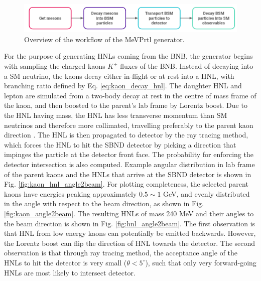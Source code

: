 \begin{figure}[htbp!] 
\centering    
\includegraphics[width=1.0\textwidth]{MeVPrtl_Workflow}
\caption[MeVPrtl_Workflow]{
Overview of the workflow of the MeVPrtl generator.
}
\label{fig:MeVPrtl_Workflow}
\end{figure}

For the purpose of generating HNLs coming from the BNB, the generator begins with sampling the charged kaons $K^{+}$ fluxes of the BNB.
Instead of decaying into a SM neutrino, the kaons decay either in-flight or at rest into a HNL, with branching ratio defined by Eq. \ref{eq:kaon_decay_hnl}.
The daughter HNL and lepton are simulated from a two-body decay at rest in the centre of mass frame of the kaon, and then boosted to the parent's lab frame by Lorentz boost.
Due to the HNL having mass, the HNL has less transverse momentum than SM neutrinos and therefore more collimated, travelling preferably to the parent kaon direction \cite{DavidePhD}.  
The HNL is then propagated to detector by the ray tracing method, which forces the HNL to hit the SBND detector by picking a direction that impinges the particle at the detector front face.
The probability for enforcing the detector intersection is also computed.
Example angular distribution in lab frame of the parent kaons and the HNLs that arrive at the SBND detector is shown in Fig. \ref{fig:kaon_hnl_angle2beam}.
For plotting completeness, the selected parent kaons have energies peaking approximately $0.5\sim1$ GeV, and evenly distributed in the angle with respect to the beam direction, as shown in Fig. \ref{fig:kaon_angle2beam}.
The resulting HNLs of mass 240 MeV and their angles to the beam direction is shown in Fig. \ref{fig:hnl_angle2beam}.
The first observation is that HNL from low energy kaons can potentially be emitted backwards.
However, the Lorentz boost can flip the direction of HNL towards the detector.  
The second observation is that through ray tracing method, the acceptance angle of the HNLs to hit the detector is very small ($\theta < 5^\circ$), such that only very forward-going HNLs are most likely to intersect detector.

